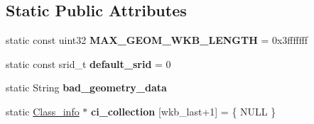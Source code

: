 \subsection*{Static Public Attributes}
\begin{DoxyCompactItemize}
\item 
\mbox{\label{classGeometry_a5c286f8189a316c78dddb6564445dadf}} 
static const uint32 {\bfseries M\+A\+X\+\_\+\+G\+E\+O\+M\+\_\+\+W\+K\+B\+\_\+\+L\+E\+N\+G\+TH} = 0x3fffffff
\item 
\mbox{\label{classGeometry_a42229135d38064ee07c5d161d3f315b1}} 
static const srid\+\_\+t {\bfseries default\+\_\+srid} = 0
\item 
\mbox{\label{classGeometry_a098d5d8d5f17732ff21e16b6adc8d78b}} 
static String {\bfseries bad\+\_\+geometry\+\_\+data}
\item 
\mbox{\label{classGeometry_a1f31bf58fc9c850d8f8e2fe56fc31817}} 
static \mbox{\hyperlink{classGeometry_1_1Class__info}{Class\+\_\+info}} $\ast$ {\bfseries ci\+\_\+collection} \mbox{[}wkb\+\_\+last+1\mbox{]} = \{ N\+U\+LL \}
\end{DoxyCompactItemize}
